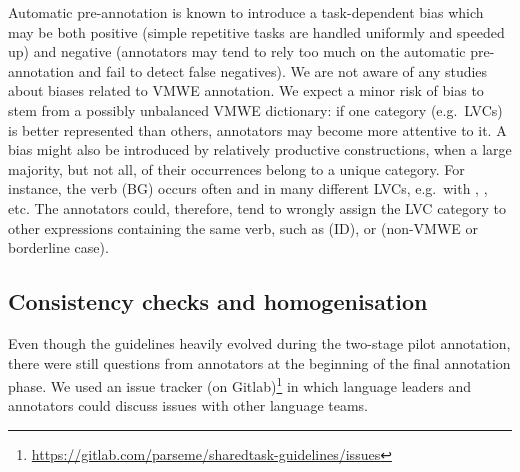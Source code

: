 \documentclass[output=paper,
modfonts,
]{langscibook}
\begin{document}
Automatic pre-annotation is known to introduce a task-dependent bias \citep{Marcus:1993:BLA:972470.972475,Fort:2010:IPP:1868720.1868727} which may be both positive (simple repetitive tasks are handled uniformly and speeded up) and negative (annotators may tend to rely too much on the automatic pre-annotation and fail to detect false negatives). We are not aware of any studies about biases related to VMWE annotation. We expect a minor risk of bias to stem from a possibly unbalanced VMWE dictionary: if one category (e.g.\ LVCs) is better represented than others, annotators may become more attentive to it. A bias might also be introduced by relatively productive constructions, when a large majority, but not all, of their occurrences belong to a unique category. For instance, the verb (BG)
 occurs often and in many different LVCs, e.g.\ with %
, %
, etc. The annotators could, therefore, tend to wrongly assign the LVC category to other expressions containing the same verb, such as  
 (ID), or %
 (non-VMWE or borderline case). 

\subsection{Consistency checks and homogenisation}
\label{sec:consistency}
%

Even though the guidelines heavily evolved during the two-stage pilot annotation, there were still questions from annotators at the beginning of the final annotation phase. We used an issue tracker (on Gitlab)\footnote{\url{https://gitlab.com/parseme/sharedtask-guidelines/issues}} in which language leaders and annotators could discuss issues with other language teams.

 
\end{document}

